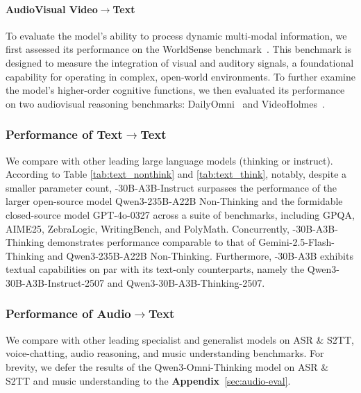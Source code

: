 \paragraph{AudioVisual Video$\to$Text}
To evaluate the model's ability to process dynamic multi-modal information, we first assessed its performance on the WorldSense benchmark~\citep{worldsense}. This benchmark is designed to measure the integration of visual and auditory signals, a foundational capability for operating in complex, open-world environments. To further examine the model's higher-order cognitive functions, we then evaluated its performance on two audiovisual reasoning benchmarks: DailyOmni~\citep{dailyomni} and VideoHolmes~\citep{videoholmes}.




\subsubsection{Performance of Text$\to$Text}
We compare \method with other leading large language models (thinking or instruct). According to Table \ref{tab:text_nonthink} and \ref{tab:text_think}, 
notably, despite a smaller parameter count, \method-30B-A3B-Instruct surpasses the performance of the larger open-source model Qwen3-235B-A22B Non-Thinking and the formidable closed-source model GPT-4o-0327 across a suite of benchmarks, including GPQA, AIME25, ZebraLogic, WritingBench, and PolyMath. Concurrently, \method-30B-A3B-Thinking demonstrates performance comparable to that of Gemini-2.5-Flash-Thinking and Qwen3-235B-A22B Non-Thinking. Furthermore, \method-30B-A3B exhibits textual capabilities on par with its text-only counterparts, namely the Qwen3-30B-A3B-Instruct-2507 and Qwen3-30B-A3B-Thinking-2507. 





\subsubsection{Performance of Audio$\to$Text}
We compare \method with other leading specialist and generalist models on ASR \& S2TT, voice-chatting, audio reasoning, and music understanding benchmarks. For brevity, we defer the results of the Qwen3-Omni-Thinking model on ASR \& S2TT and music understanding to the \textbf{Appendix}~\ref{sec:audio-eval}.



